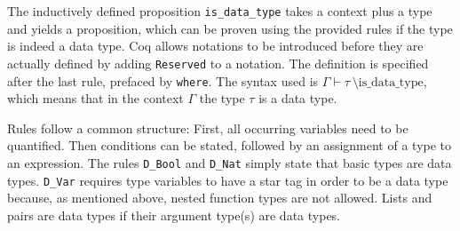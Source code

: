\documentclass[fleqn, abstract=on]{scrreprt}
\newcommand{\coqinline}[1]{\texttt{#1}}
\begin{document}
The inductively defined proposition \coqinline{is_data_type} takes a context plus a type and yields a proposition, which can be proven using the provided rules if the type is indeed a data type. Coq allows notations to be introduced before they are actually defined by adding \coqinline{Reserved} to a notation. The definition is specified after the last rule, prefaced by \coqinline{where}. The syntax used is $\Gamma \vdash \tau \: \text{\textbackslash is\_data\_type}$, which means that in the context $\Gamma$ the type $\tau$ is a data type.
\par
Rules follow a common structure: First, all occurring variables need to be quantified. Then conditions can be stated, followed by an assignment of a type to an expression.
The rules \coqinline{D_Bool} and \coqinline{D_Nat} simply state that basic types are data types. \coqinline{D_Var} requires type variables to have a star tag in order to be a data type because, as mentioned above, nested function types are not allowed. Lists and pairs are data types if their argument type(s) are data types. 
\par
\end{document}
